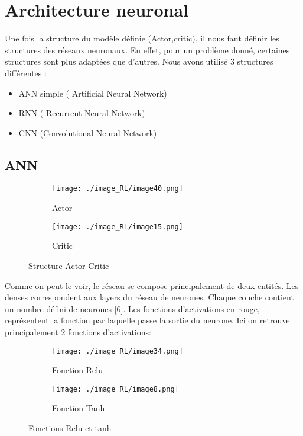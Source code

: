 \section{Architecture neuronal}
Une fois la structure du modèle définie (Actor,critic), il nous faut définir les structures des réseaux neuronaux.
En effet, pour un problème donné, certaines structures sont plus adaptées que d’autres.
Nous avons utilisé 3 structures différentes :

\begin{itemize}
    \item ANN simple ( Artificial Neural Network)
    \item RNN ( Recurrent Neural Network)
    \item CNN (Convolutional Neural Network)
\end{itemize}

\subsection{ANN}

\begin{figure}[H]
    \begin{subfigure}[b]{0.45\textwidth}
        \centering
        \texttt{[image: ./image\_RL/image40.png]}
        \caption{Actor}
    \end{subfigure}
    \hfill
    \begin{subfigure}[b]{0.45\textwidth}
        \centering
        \texttt{[image: ./image\_RL/image15.png]}
        \caption{Critic}
    \end{subfigure}
    \caption{Structure Actor-Critic}
\end{figure}

Comme on peut le voir, le réseau se compose principalement de deux entités.
Les denses correspondent aux layers du réseau de neurones. Chaque couche contient un nombre défini de neurones [6].
Les fonctions d’activations en rouge, représentent la fonction par laquelle passe la sortie du neurone.\cite{ANN}
Ici on retrouve principalement 2 fonctions d’activations:

\begin{figure}[H]
    \begin{subfigure}[b]{0.45\textwidth}
        \centering
        \texttt{[image: ./image\_RL/image34.png]}
        \caption{Fonction Relu}
    \end{subfigure}
    \hfill
    \begin{subfigure}[b]{0.45\textwidth}
        \centering
        \texttt{[image: ./image\_RL/image8.png]}
        \caption{Fonction Tanh}
    \end{subfigure}
    \caption{Fonctions Relu et tanh}
\end{figure}

